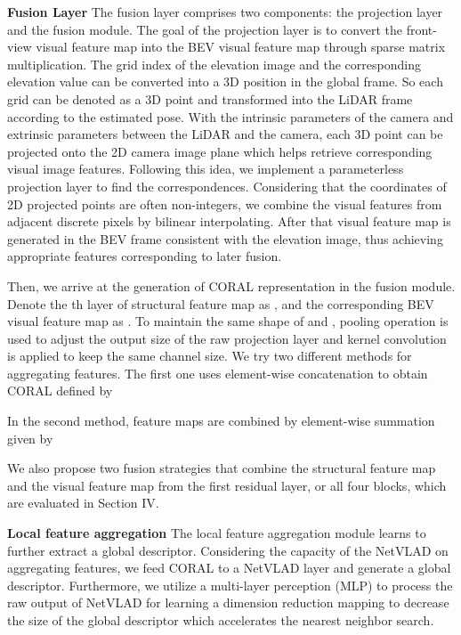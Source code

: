 \documentclass[letterpaper, 10 pt, conference]{ieeeconf}  \usepackage{tabularx}
\begin{document}
\textbf{Fusion Layer} The fusion layer comprises two components: the projection layer and the fusion module. The goal of the projection layer is to convert the front-view visual feature map into the BEV visual feature map through sparse matrix multiplication. The grid index of the elevation image and the corresponding elevation value can be converted into a 3D position in the global frame. So each grid can be denoted as a 3D point and transformed into the LiDAR frame according to the estimated pose. With the intrinsic parameters of the camera and extrinsic parameters between the LiDAR and the camera, each 3D point can be projected onto the 2D camera image plane which helps retrieve corresponding visual image features. Following this idea, we implement a parameterless projection layer to find the correspondences. Considering that the coordinates of 2D projected points are often non-integers, we combine the visual features from adjacent discrete pixels by bilinear interpolating.  After that visual feature map is generated in the BEV frame consistent with the elevation image, thus achieving appropriate features corresponding to later fusion.

Then, we arrive at the generation of CORAL representation in the fusion module. Denote the th layer of structural feature map as , and the corresponding BEV visual feature map as . To maintain the same shape of  and , pooling operation  is used to adjust the output size of the raw projection layer  and  kernel convolution  is applied to keep the same channel size. We try two different methods for aggregating features. The first one uses element-wise concatenation to obtain CORAL  defined by

In the second method, feature maps are combined by element-wise summation given by


We also propose two fusion strategies that combine the structural feature map and the visual feature map from the first residual layer, or all four blocks, which are evaluated in Section IV.

\textbf{Local feature aggregation} The local feature aggregation module learns to further extract a global descriptor. Considering the capacity of the NetVLAD on aggregating features, we feed CORAL to a NetVLAD layer and generate a global descriptor. Furthermore, we utilize a multi-layer perception (MLP) to process the raw output of NetVLAD for learning a dimension reduction mapping to decrease the size of the global descriptor which accelerates the nearest neighbor search.
\end{document}
